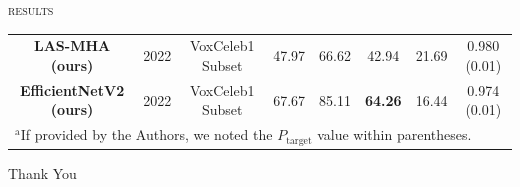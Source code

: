 \documentclass[10pt,aspectratio=1610,professionalfont]{beamer}
\begin{document}
\begin{frame}{\textsc{results}}
\begin{center}
\begin{table}[htbp]
{\begin{tabular}{|c|c|c|c|c|c|c|c|}
        \textbf{LAS-MHA (ours)} & 2022 & VoxCeleb1 Subset & 47.97 & 66.62 & 42.94 & 21.69 & 0.980 (0.01) \\
        \textbf{EfficientNetV2 (ours)} & 2022 & VoxCeleb1 Subset & 67.67 & 85.11 & \textbf{64.26} & 16.44 & 0.974 (0.01) \\
        \hline
        \multicolumn{8}{l}{$^{\mathrm{a}}$If provided by the Authors, we noted the $P_{\text{target}}$ value within parentheses.} \\
        \end{tabular}
	}
	\end{table}
    \end{center}
\end{frame}




\begin{frame}[standout]
    Thank You
\end{frame}
\end{document}

